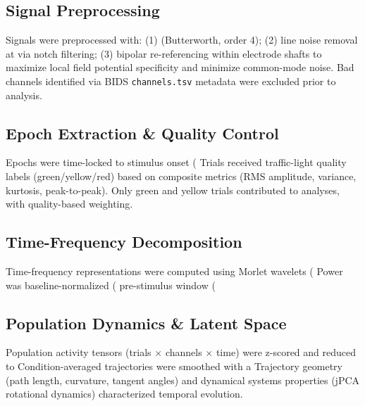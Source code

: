 \documentclass[10pt, letterpaper]{article}
\begin{document}
\subsection{Signal Preprocessing}
Signals were preprocessed with: (1) %
(Butterworth, order 4); (2) line noise removal at %
via notch filtering; (3) bipolar re-referencing within electrode shafts to maximize
local field potential specificity and minimize common-mode noise.
Bad channels identified via BIDS \texttt{channels.tsv} metadata were excluded
prior to analysis.

\subsection{Epoch Extraction \& Quality Control}
Epochs were time-locked to stimulus onset (%
Trials received traffic-light quality labels (green/yellow/red) based on composite metrics
(RMS amplitude, variance, kurtosis, peak-to-peak). Only green and yellow trials
contributed to analyses, with quality-based weighting.

\subsection{Time-Frequency Decomposition}
Time-frequency representations were computed using Morlet wavelets
(%
Power was baseline-normalized (%
pre-stimulus window (%

\subsection{Population Dynamics \& Latent Space}
Population activity tensors (trials $\times$ channels $\times$ time) were
z-scored and reduced to %
Condition-averaged trajectories were smoothed with a %
Trajectory geometry (path length, curvature, tangent angles) and dynamical systems
properties (jPCA rotational dynamics) characterized temporal evolution.
\end{document}
